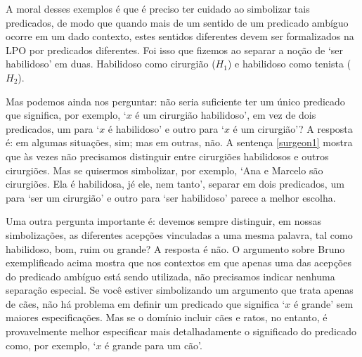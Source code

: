 A moral desses exemplos é que é preciso ter cuidado ao simbolizar tais predicados, de modo que quando mais de um sentido de um predicado ambíguo ocorre em um dado contexto, estes sentidos diferentes devem ser formalizados na LPO por predicados diferentes.
Foi isso que fizemos ao separar a noção de `ser habilidoso' em duas. Habilidoso como cirurgião ($H_1$) e habilidoso como tenista ($H_2$). 

Mas podemos ainda nos perguntar: não seria suficiente ter um único predicado que significa, por exemplo, `$x$ é um cirurgião habilidoso', em vez de dois predicados, um para  `$x$ é habilidoso' e outro para  `$x$ é um cirurgião'?
A resposta é: em algumas situações, sim; mas em outras, não.
A sentença \ref{surgeon1} mostra que às vezes não precisamos distinguir entre cirurgiões habilidosos e outros cirurgiões.
Mas se quisermos simbolizar, por exemplo, `Ana e Marcelo são cirurgiões. Ela é habilidosa, jé ele, nem tanto', separar em dois predicados, um para `ser um cirurgião' e outro para `ser habilidoso' parece a melhor escolha.

Uma outra pergunta importante é: devemos sempre distinguir, em nossas simbolizações, as diferentes  acepções vinculadas a uma mesma palavra, tal como habilidoso, bom, ruim ou grande?
A resposta é não. O argumento sobre Bruno exemplificado acima mostra que nos contextos em que apenas uma das acepções do predicado ambíguo está sendo utilizada, não precisamos indicar nenhuma separação especial.
Se você estiver simbolizando um argumento que trata apenas de cães, não há problema em definir um predicado que significa `$x$ é grande' sem maiores especificações.
Mas se o domínio incluir cães e ratos, no entanto, é provavelmente melhor especificar mais detalhadamente o significado do predicado como, por exemplo, `$x$ é grande para um cão'.


